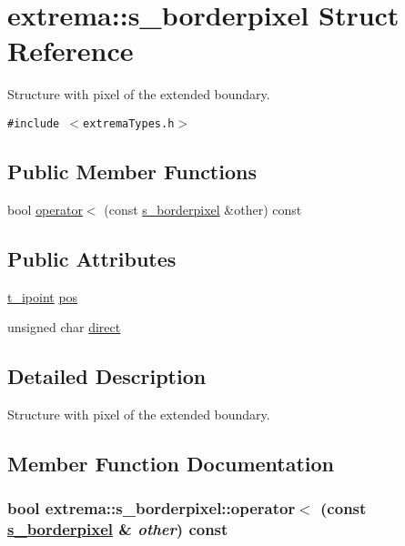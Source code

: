 \hypertarget{structextrema_1_1s__borderpixel}{
\section{extrema::s\_\-borderpixel Struct Reference}
\label{structextrema_1_1s__borderpixel}
}
Structure with pixel of the extended boundary.  


{\tt \#include $<$extrema\-Types.h$>$}

\subsection*{Public Member Functions}
\begin{CompactItemize}
\item 
bool \hyperlink{structextrema_1_1s__borderpixel_fe518546a89f2ec5f65ee48d02d1519c}{operator$<$} (const \hyperlink{structextrema_1_1s__borderpixel}{s\_\-borderpixel} \&other) const 
\end{CompactItemize}
\subsection*{Public Attributes}
\begin{CompactItemize}
\item 
\hyperlink{structextrema_1_1t__ipoint}{t\_\-ipoint} \hyperlink{structextrema_1_1s__borderpixel_72a12084228bf9a156f1fb9a8a74aa41}{pos}
\item 
unsigned char \hyperlink{structextrema_1_1s__borderpixel_2eaf0ce8aedba03fb74365ac9bbbf390}{direct}
\end{CompactItemize}


\subsection{Detailed Description}
Structure with pixel of the extended boundary. 



\subsection{Member Function Documentation}
\hypertarget{structextrema_1_1s__borderpixel_fe518546a89f2ec5f65ee48d02d1519c}{
\subsubsection[operator$<$]{\setlength{\rightskip}{0pt plus 5cm}bool extrema::s\_\-borderpixel::operator$<$ (const \hyperlink{structextrema_1_1s__borderpixel}{s\_\-borderpixel} \& {\em other}) const}}
\label{structextrema_1_1s__borderpixel_fe518546a89f2ec5f65ee48d02d1519c}




